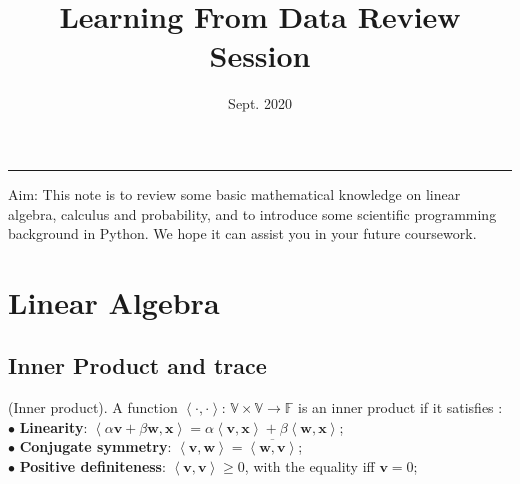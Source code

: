 \documentclass[10pt]{article}
\title{Learning From Data Review Session}
\date{Sept. 2020}
\begin{document}
\courseheader
{}
\rule{\textwidth}{2pt}

Aim: This note is to review some basic mathematical knowledge on linear algebra, calculus and probability, and to introduce some scientific programming background in Python. We hope it can assist you in your future coursework.

\section{Linear Algebra}
\subsection{Inner Product and trace}

\begin{definition}(Inner product). A function $\left<\cdot,\cdot\right>$: $\mathbb{V} \times \mathbb{V} \rightarrow \mathbb{F}$ is an inner product if it satisfies \cite{Gilbert}:\\

$\bullet$ \textbf{Linearity}: $\left<\alpha \bm{v} + \beta \bm{w}, \bm{x}\right> = \alpha\left<\bm{v}, \bm{x}\right> + \beta\left<\bm{w},\bm{x}\right>$;\\

$\bullet$ \textbf{Conjugate symmetry}: $\left<\bm{v}, \bm{w}\right> = \overline{\left<\bm{w},\bm{v}\right>}$;\\

$\bullet$ \textbf{Positive definiteness}: $\left<\bm{v}, \bm{v}\right> \geq 0$, with the equality iff $\bm{v} = 0$;\\
\end{definition}
\end{document}
